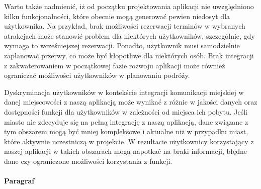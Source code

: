 \indent Warto także nadmienić, iż od początku projektowania aplikacji nie uwzględniono kilku funkcjonalności, które obecnie mogą generować pewien niedosyt dla użytkownika. Na przykład, brak możliwości rezerwacji terminów w wybranych atrakcjach może stanowić problem dla niektórych użytkowników, szczególnie, gdy wymaga to wcześniejszej rezerwacji. Ponadto, użytkownik musi samodzielnie zaplanować przerwy, co może być kłopotliwe dla niektórych osób. Brak integracji z zakwaterowaniem w początkowej fazie rozwoju aplikacji może również ograniczać możliwości użytkowników w planowaniu podróży.\newline

\indent Dyskryminacja użytkowników w kontekście integracji komunikacji miejskiej w danej miejscowości z naszą aplikacją może wynikać z różnic w jakości danych oraz dostępności funkcji dla użytkowników w zależności od miejsca ich pobytu.
Jeśli miasto nie zdecyduje się na pełną integrację z naszą aplikacją, dane związane z tym obszarem mogą być mniej kompleksowe i aktualne niż w przypadku miast, które aktywnie uczestniczą w projekcie. W rezultacie użytkownicy korzystający z naszej aplikacji w takich obszarach mogą napotkać na braki informacji, błędne dane czy ograniczone możliwości korzystania z funkcji.

\paragraph{Paragraf}


